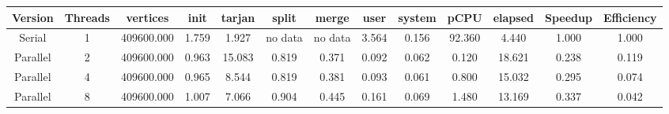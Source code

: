 \begin{tabular}{|c|c|c|c|c|c|c|c|c|c|c|c|c|}
\toprule
 Version &  Threads &   vertices &  init &  tarjan &   split &   merge &  user &  system &   pCPU &  elapsed &  Speedup &  Efficiency \\
\midrule
  Serial &        1 & 409600.000 & 1.759 &   1.927 & no data & no data & 3.564 &   0.156 & 92.360 &    4.440 &    1.000 &       1.000 \\
Parallel &        2 & 409600.000 & 0.963 &  15.083 &   0.819 &   0.371 & 0.092 &   0.062 &  0.120 &   18.621 &    0.238 &       0.119 \\
Parallel &        4 & 409600.000 & 0.965 &   8.544 &   0.819 &   0.381 & 0.093 &   0.061 &  0.800 &   15.032 &    0.295 &       0.074 \\
Parallel &        8 & 409600.000 & 1.007 &   7.066 &   0.904 &   0.445 & 0.161 &   0.069 &  1.480 &   13.169 &    0.337 &       0.042 \\
\bottomrule
\end{tabular}
